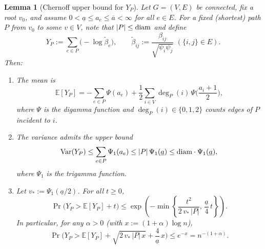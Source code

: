 \documentclass[a4paper, 11pt]{article}
\newcommand{\E}{\mathbb{E}}
\newcommand{\var}{\textnormal{Var}}
\newcommand{\diam}{\textnormal{diam}}
\newtheorem{lem}[thm]{Lemma}
\begin{document}
\begin{lem}[Chernoff upper bound for $Y_P$]\label{lem:chebyshev-upper}
Let $G=(V,E)$ be connected, fix a root $v_0$, and assume $0<\underline{a}\le a_e\le \overline{a}<\infty$ for all $e\in E$.
For a fixed (shortest) path $P$ from $v_0$ to some $v\in V$, note that $|P|\le \diam$ and define
\[
Y_P:= \sum_{e\in P}\big(-\log \tilde\beta_e\big),
\qquad 
\tilde\beta_{ij}:=\frac{\beta_{ij}}{\sqrt{\psi_i\psi_j}}\,\,(\{i,j\}\in E).
\]
Then:
\begin{enumerate}
\item[\emph{(a)}] The mean is
\begin{equation}\label{eq:EY-simple}
\E[Y_P]= -\sum_{e\in P}\Psi(a_e)+ 
\frac12
\sum_{i\in V}\deg_P(i)\,\Psi\Big(\frac{a_i+1}{2}\Big),
\end{equation}
where $\Psi$ is the digamma function and $\deg_P(i)\in\{0,1,2\}$ counts edges of $P$ incident to $i$.
\item[\emph{(b)}] The variance admits the upper bound
\begin{equation}\label{eq:VarY-simple-upper}
\var(Y_P)\le \sum_{e\in P}\Psi_1(a_e)\le |P|\,\Psi_1(\underline{a})\le \diam\cdot\Psi_1(\underline{a}),
\end{equation}
where $\Psi_1$ is the trigamma function.
\item[\emph{(c)}] Let $v_*:=\Psi_1(\underline{a}/2)$. For all $t\ge 0$,
\begin{equation}\label{eq:Chernoff-tail}
\Pr\big(Y_P>\E[Y_P]+t\big)\le \exp\!\left(-\min\left\{\frac{t^2}{2\,v_*\,|P|},\,\frac{\underline{a}}{4}\,t\right\}\right).
\end{equation}
In particular, for any $\alpha>0$ (with $x:=(1+\alpha)\log n$),
\begin{equation}\label{eq:Chernoff-nalpha}
\Pr\Big(Y_P>\E[Y_P]+\sqrt{2\,v_*\,|P|\,x}+\frac{4}{\underline{a}}\,x\Big)\le e^{-x}=n^{-(1+\alpha)}.
\end{equation}
\end{enumerate}
\end{lem}
\end{document}
